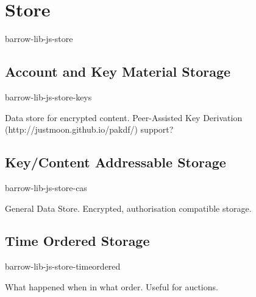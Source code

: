 \section{Store}
barrow-lib-js-store

\subsection{Account and Key Material Storage}
barrow-lib-js-store-keys

Data store for encrypted content.
Peer-Assisted Key Derivation (http://justmoon.github.io/pakdf/) support?

\subsection{Key/Content Addressable Storage}
barrow-lib-js-store-cas

General Data Store. Encrypted, authorisation compatible storage.

\subsection{Time Ordered Storage}
barrow-lib-js-store-timeordered

What happened when in what order. Useful for auctions.
